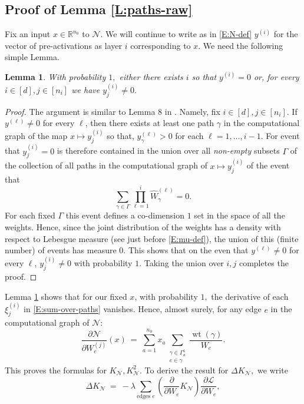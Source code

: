 \documentclass[11pt, reqno]{amsart}
\newtheorem{lemma}[theorem]{Lemma}
\newcommand{\R}{{\mathbb R}}
\newcommand{\e}{\mathbb E}
\newcommand{\lr}[1]{\ensuremath{\left(#1 \right)}}
\newcommand{\mN}{\mathcal N}
\DeclareMathOperator{\wt}{wt}
\begin{document}
\subsection{Proof of Lemma \ref{L:paths-raw}}\label{S:paths-raw-pf} 
Fix an input $x\in \R^{n_0}$ to $\mN$. We will continue to write as in \eqref{E:N-def} $y^{(i)}$ for the vector of pre-activations as layer $i$ corresponding to $x.$ We need the following simple Lemma. 
\begin{lemma}\label{L:non-deg}
  With probability $1,$ either there exists $i$ so that $y^{(i)}=0$ or, for every $i\in [d],j\in [n_i]$ we have $y_j^{(i)}\neq 0.$
\end{lemma}
\begin{proof}
  The argument is similar to Lemma 8 in  \cite{hanin2019deep}. Namely, fix $i\in [d],j\in[n_i].$ If $y^{(\ell)}\neq 0$ for every $\ell$, then there exists at least one path $\gamma$ in the computational graph of the map $x\mapsto y_j^{(i)}$ so that,  $y_\gamma^{(\ell)}>0$ for each $\ell = 1,\ldots, i-1.$ For event that $y_j^{(i)}=0$ is therefore contained in the union over all \textit{non-empty} subsets $\Gamma$ of the collection of all paths in the computational graph of $x\mapsto y_j^{(i)}$ of the event that 
\[\sum_{\gamma \in \Gamma} \prod_{\ell=1}^i \widehat{W}_{\gamma}^{(\ell)}=0.\]
For each fixed $\Gamma$ this event defines a co-dimension $1$ set in the space of all the weights. Hence, since the joint distribution of the weights has a density with respect to Lebesgue measure (see just before \eqref{E:mu-def}), the union of this (finite number) of events has measure $0$. This shows that on the even that $y^{(\ell)}\neq 0$ for every $\ell$, $y_j^{(i)}\neq 0$ with probability $1.$ Taking the union over $i,j$ completes the proof. 
\end{proof}
Lemma \ref{L:non-deg} shows that for our fixed $x$, with probability $1,$ the derivative of each $\xi_j^{(i)}$ in \eqref{E:sum-over-paths} vanishes. Hence, almost surely, for any edge $e$ in the computational graph of $\mN:$
\begin{equation}\label{E:sum-over-paths-deriv}
\frac{\partial \mN}{\partial W_{e}^{(j)}}(x)~=~\sum_{a=1}^{n_0} x_a \sum_{\substack{\gamma\in \Gamma_a^1\\e\in \gamma}} \frac{\wt(\gamma)}{W_e}.
\end{equation}
This proves the formulas for $K_{\mN}, K_{\mN}^2.$ To derive the result for $\Delta K_{\mN},$ we write
\[\Delta K_{\mN}~=~ -\lambda \sum_{\text{edges }e} \lr{\frac{\partial }{\partial W_e} K_{\mN}} \frac{\partial \mathcal L}{\partial W_e },\]
\end{document}
